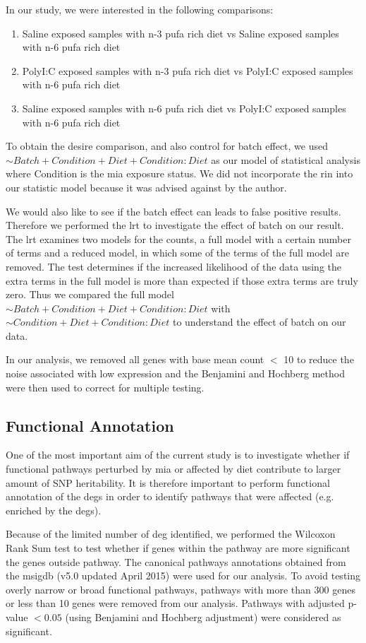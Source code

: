 In our study, we were interested in the following comparisons:
\begin{enumerate}
	\item Saline exposed samples with n-3 \gls{pufa} rich diet vs Saline exposed samples with n-6 \gls{pufa} rich diet 
	\item PolyI:C exposed samples with n-3 \gls{pufa} rich diet vs PolyI:C exposed samples with n-6 \gls{pufa} rich diet 
	\item Saline exposed samples with n-6 \gls{pufa} rich diet vs PolyI:C exposed samples with n-6 \gls{pufa} rich diet 
\end{enumerate}
To obtain the desire comparison, and also control for batch effect, we used $\sim Batch+Condition+Diet+Condition:Diet$ as our model of statistical analysis where Condition is the \gls{mia} exposure status.
We did not incorporate the \gls{rin} into our statistic model because it was advised against by the author.

We would also like to see if the batch effect can leads to false positive results.
Therefore we performed the \gls{lrt} to investigate the effect of batch on our result.
The \gls{lrt} examines two models for the counts, a full model with a certain number of terms and a reduced model, in which some of the terms of the full model are removed. 
The test determines if the increased likelihood of the data using the extra terms in the full model is more than expected if those extra terms are truly zero.
Thus we compared the full model $\sim Batch+Condition+Diet+Condition:Diet$ with $\sim Condition+Diet+Condition:Diet$ to understand the effect of batch on our data.

In our analysis, we removed all genes with base mean count $<$ 10  to reduce the noise associated with low expression and the Benjamini and Hochberg method were then used to correct for multiple testing.

\subsection{Functional Annotation}
\label{sec:function}
One of the most important aim of the current study is to investigate whether if functional pathways perturbed by \gls{mia} or affected by diet contribute to larger amount of \gls{SNP} heritability.
It is therefore important to perform functional annotation of the \glspl{deg} in order to identify pathways that were affected (e.g. enriched by the \glspl{deg}).

Because of the limited number of \gls{deg} identified, we performed the Wilcoxon Rank Sum test to test whether if genes within the pathway are more significant the genes outside pathway.
The canonical pathways annotations obtained from the \gls{msigdb} (v5.0 updated April 2015) \citep{Subramanian2005} were used for our analysis.
To avoid testing overly narrow or broad functional pathways, pathways with more than 300 genes or less than 10 genes were removed from our analysis. 
Pathways with adjusted p-value $<0.05$ (using Benjamini and Hochberg adjustment) were considered as significant.

